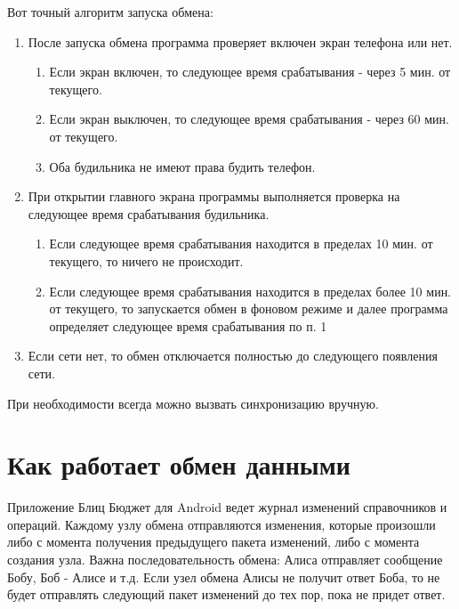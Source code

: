 \documentclass[a4paper,10pt,russian]{sphinxmanual}
\begin{document}
Вот точный алгоритм запуска обмена:
\begin{enumerate}
\def\theenumi{\arabic{enumi}}
\def\labelenumi{\theenumi .}
\makeatletter\def\p@enumii{\p@enumi \theenumi .}\makeatother
\item {} 
После запуска обмена программа проверяет включен экран телефона или нет.
\begin{enumerate}
\def\theenumii{\arabic{enumii}}
\def\labelenumii{\theenumii .}
\makeatletter\def\p@enumiii{\p@enumii \theenumii .}\makeatother
\item {} 
Если экран включен, то следующее время срабатывания - через 5 мин. от текущего.

\item {} 
Если экран выключен, то следующее время срабатывания - через 60 мин. от текущего.

\item {} 
Оба будильника не имеют права будить телефон.

\end{enumerate}

\item {} 
При открытии главного экрана программы выполняется проверка на следующее время срабатывания будильника.
\begin{enumerate}
\def\theenumii{\arabic{enumii}}
\def\labelenumii{\theenumii .}
\makeatletter\def\p@enumiii{\p@enumii \theenumii .}\makeatother
\item {} 
Если следующее время срабатывания находится в пределах 10 мин. от текущего, то ничего не происходит.

\item {} 
Если следующее время срабатывания находится в пределах более 10 мин. от текущего, то запускается обмен в фоновом режиме и далее программа определяет следующее время срабатывания по п. 1

\end{enumerate}

\item {} 
Если сети нет, то обмен отключается полностью до следующего появления сети.

\end{enumerate}

При необходимости всегда можно вызвать синхронизацию вручную.


\section{Как работает обмен данными}
\label{\detokenize{teamwork:id7}}
Приложение Блиц Бюджет для Android ведет журнал изменений справочников и операций. Каждому узлу обмена отправляются изменения,
которые произошли либо с момента получения предыдущего пакета изменений, либо с момента создания узла.
Важна последовательность обмена: Алиса отправляет сообщение Бобу, Боб - Алисе и т.д. Если узел обмена Алисы не
получит ответ Боба, то не будет отправлять следующий пакет изменений до тех пор, пока не придет ответ.
\end{document}
